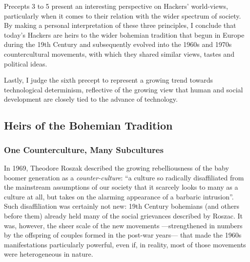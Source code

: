 Precepts 3 to 5 present an interesting perspective on Hackers' world-views, particularly when it comes to their relation with the wider spectrum of society. By making a personal interpretation of these three principles, I conclude that today's Hackers are heirs to the wider bohemian tradition that begun in Europe during the 19th Century and subsequently evolved into the 1960s and 1970s countercultural movements, with which they shared similar views, tastes and political ideas.

Lastly, I judge the sixth precept to represent a growing trend towards technological determinism, reflective of the growing view that human and social development are closely tied to the advance of technology. 


\subsection{Heirs of the Bohemian Tradition}








\subsubsection{One Counterculture, Many Subcultures}


In 1969, Theodore Roszak described the growing rebelliousness of the baby boomer generation as a \textit{counter-culture}: ``a culture so radically disaffiliated from the mainstream assumptions of our society that it scarcely looks to many as a culture at all, but takes on the alarming appearance of a barbaric intrusion''. Such disaffiliation was certainly not new: 19th Century bohemians (and others before them) already held many of the social grievances described by Roszac. It was, however, the sheer scale of the new movements ---strengthened in numbers by the offspring of couples formed in the post-war years--- that made the 1960s manifestations particularly powerful, even if, in reality, most of those movements were heterogeneous in nature.

